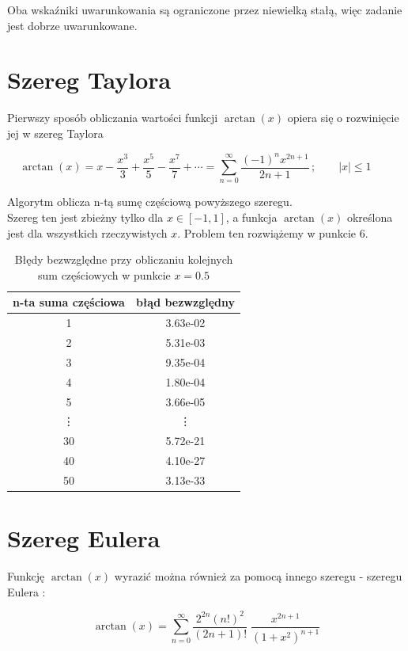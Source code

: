 \documentclass{article}
\begin{document}
Oba wskaźniki uwarunkowania są ograniczone przez niewielką stałą, więc zadanie jest dobrze uwarunkowane. 

\section{Szereg Taylora}
Pierwszy sposób obliczania wartości funkcji $\arctan(x)$ opiera się o rozwinięcie jej w szereg Taylora \cite{fichtenholz}

\begin{equation}
\arctan(x)=x-{\frac {x^{3}}{3}}+{\frac {x^{5}}{5}}-{\frac {x^{7}}{7}}+\cdots =\sum _{n=0}^{\infty }{\frac {(-1)^{n}x^{2n+1}}{2n+1}}\,;\qquad |x|\leq 1\qquad 
\end{equation}

Algorytm oblicza n-tą sumę częściową powyższego szeregu.\\
Szereg ten jest zbieżny tylko dla $x \in [-1,1]$, a funkcja $\arctan(x)$ określona jest dla wszystkich rzeczywistych $x$.
Problem ten rozwiążemy w punkcie 6.

\begin{table}[h]
	\centering
	\begin{tabular}{|c|c|} \hline
		n-ta suma częściowa & błąd bezwzględny \\ \hline
		1 &  3.63e-02\\
		2 &  5.31e-03\\
		3 &  9.35e-04\\
		4 &  1.80e-04\\
		5 &  3.66e-05\\
		\vdots & \vdots \\
		30  &  5.72e-21 \\
		40 &  4.10e-27 \\
		50 &  3.13e-33\\
		\hline
	\end{tabular}
	\caption{Błędy bezwzględne przy obliczaniu kolejnych sum częściowych w punkcie $x = 0.5$}
\end{table}

\section{Szereg Eulera}

Funkcję $\arctan(x)$ wyrazić można również za pomocą innego szeregu - szeregu Eulera \cite{wolfram}:

\begin{equation}
\arctan (x)=\sum _{n=0}^{\infty }{\frac {2^{2n}(n!)^{2}}{(2n+1)!}}\;{\frac {x^{2n+1}}{(1+x^{2})^{n+1}}}
\end{equation}
\end{document}
